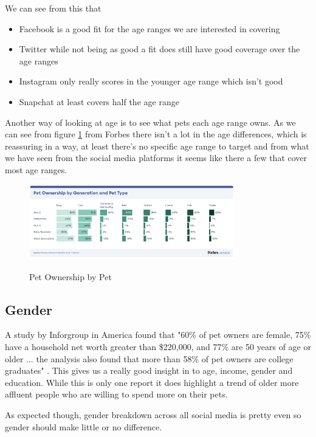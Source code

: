 \documentclass{article}
\begin{document}
We can see from this that
\begin{itemize}
    \item Facebook is a good fit for the age ranges we are interested in covering
    \item Twitter while not being as good a fit does still have good coverage over the age ranges
    \item Instagram only really scores in the younger age range which isn't good
    \item Snapchat at least covers half the age range
\end{itemize}

Another way of looking at age is to see what pets each age range owns. As we can see from figure \ref{fig:pets} from Forbes \cite{ownersage} there isn't a lot in the age differences, which is reassuring in a way, at least there's no specific age range to target and from what we have seen from the social media platforms it seems like there a few that cover most age ranges.

\FloatBarrier
\begin{figure}[ht]
    \caption{Pet Ownership by Pet}
    \centering
    \includegraphics[width=0.8\textwidth]{OwnersByAge}
    \label{fig:pets}
    \end{figure}
    \FloatBarrier

\subsection{Gender}
A study by Inforgroup in America found that "60\% of pet owners are female, 75\% have a household net worth greater than \$220,000, and 77\% are 50 years of age or older ... the analysis also found that more than 58\% of pet owners are college graduates" \cite{data}. This gives us a really good insight in to age, income, gender and education. While this is only one report it does highlight a trend of older more affluent people who are willing to spend more on their pets.

As expected though, gender breakdown across all social media is pretty even \cite{gender} so gender should make little or no difference.
\end{document}
